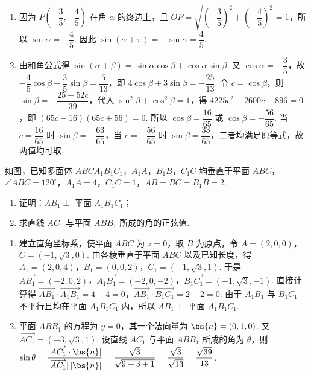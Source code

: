 \begin{solution}
\begin{enumerate}
  \item 因为 \(P\left(-\dfrac35,-\dfrac45\right)\) 在角 \(\alpha\) 的终边上，且 \(OP=\sqrt{\left(-\dfrac35\right)^2+\left(-\dfrac45\right)^2}=1\)，所以 \(\sin\alpha=-\dfrac45\). 因此 \(\sin(\alpha+\pi)=-\sin\alpha=\dfrac45\).
  \item 由和角公式得 \(\sin(\alpha+\beta)=\sin\alpha\cos\beta+\cos\alpha\sin\beta\). 又 \(\cos\alpha=-\dfrac35\)，故 \(-\dfrac45\cos\beta-\dfrac35\sin\beta=\dfrac5{13}\)，即 \(4\cos\beta+3\sin\beta=-\dfrac{25}{13}\). 令 \(c=\cos\beta\)，则 \(\sin\beta=-\dfrac{25+52c}{39}\)，代入 \(\sin^2\beta+\cos^2\beta=1\)，得 \(4225c^2+2600c-896=0\)，即 \((65c-16)(65c+56)=0\). 所以 \(\cos\beta=\dfrac{16}{65}\) 或 \(\cos\beta=-\dfrac{56}{65}\). 当 \(c=\dfrac{16}{65}\) 时 \(\sin\beta=-\dfrac{63}{65}\)，当 \(c=-\dfrac{56}{65}\) 时 \(\sin\beta=\dfrac{33}{65}\)，二者均满足原等式，故两值均可取.
\end{enumerate}
\end{solution}

\begin{problem}
如图，已知多面体 \(ABCA_1B_1C_1\)，\(A_1A\)，\(B_1B\)，\(C_1C\) 均垂直于平面 \(ABC\)，\(\angle ABC=120^\circ\)，\(A_1A=4\)，\(C_1C=1\)，\(AB=BC=B_1B=2\).

\begin{enumerate}
  \item 证明：\(AB_1\perp\) 平面 \(A_1B_1C_1\)；
  \item 求直线 \(AC_1\) 与平面 \(ABB_1\) 所成的角的正弦值.
\end{enumerate}

\end{problem}

\begin{solution}
\begin{enumerate}
  \item 建立直角坐标系，使平面 \(ABC\) 为 \(z=0\)，取 \(B\) 为原点，令 \(A=(2,0,0)\)，\(C=(-1,\sqrt3,0)\). 由各棱垂直于平面 \(ABC\) 以及已知长度，得 \(A_1=(2,0,4)\)，\(B_1=(0,0,2)\)，\(C_1=(-1,\sqrt3,1)\). 于是 \(\overrightarrow{AB_1}=(-2,0,2)\)，\(\overrightarrow{A_1B_1}=(-2,0,-2)\)，\(\overrightarrow{B_1C_1}=(-1,\sqrt3,-1)\). 直接计算得 \(\overrightarrow{AB_1}\cdot\overrightarrow{A_1B_1}=4-4=0\)，\(\overrightarrow{AB_1}\cdot\overrightarrow{B_1C_1}=2-2=0\). 由于 \(A_1B_1\) 与 \(B_1C_1\) 不平行且均在平面 \(A_1B_1C_1\) 内，所以 \(AB_1\perp\) 平面 \(A_1B_1C_1\).
  \item 平面 \(ABB_1\) 的方程为 \(y=0\)，其一个法向量为 \(\bs{n}=(0,1,0)\). 又 \(\overrightarrow{AC_1}=(-3,\sqrt3,1)\). 设直线 \(AC_1\) 与平面 \(ABB_1\) 所成的角为 \(\theta\)，则 \(\sin\theta=\dfrac{|\overrightarrow{AC_1}\cdot\bs{n}|}{|\overrightarrow{AC_1}|\,|\bs{n}|}=\dfrac{\sqrt3}{\sqrt{9+3+1}}=\dfrac{\sqrt3}{\sqrt{13}}=\dfrac{\sqrt{39}}{13}\).
\end{enumerate}
\end{solution}

